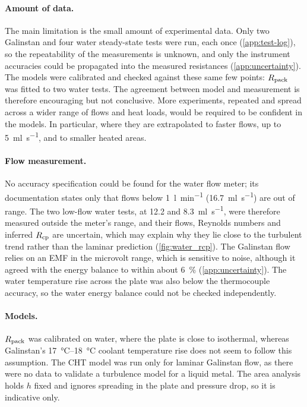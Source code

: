 \paragraph{Amount of data.} The main limitation is the small amount of
experimental data. Only two Galinstan and four water steady-state tests were
run, each once (\cref{app:test-log}), so the repeatability of the measurements
is unknown, and only the instrument accuracies could be propagated into the
measured resistances (\cref{app:uncertainty}). The models
were calibrated and checked against these same few points: $R_{\mathrm{pack}}$ was fitted
to two water tests. The agreement between model and measurement is therefore encouraging
but not conclusive. More experiments, repeated and spread across a wider
range of flows and heat loads, would be required to be confident in the models.
In particular, where they are extrapolated to faster flows, up to \SI{5}{\milli\litre\per\second}, and
to smaller heated areas.

\paragraph{Flow measurement.} No accuracy specification could be found for the
water flow meter; its documentation states only that flows below
\SI{1}{\litre\per\minute} (\SI{16.7}{\milli\litre\per\second}) are out of range.
The two low-flow water tests, at 12.2 and \SI{8.3}{\milli\litre\per\second},
were therefore measured outside the meter's range, and their flows, Reynolds
numbers and inferred $R_{\mathrm{cp}}$ are uncertain, which may explain why they lie close
to the turbulent trend rather than the laminar prediction
(\cref{fig:water_rcp}). The Galinstan flow relies on an EMF in the microvolt
range, which is sensitive to noise, although it agreed with the energy balance
to within about \SI{6}{\percent} (\cref{app:uncertainty}). The water temperature rise across the plate was also
below the thermocouple accuracy, so the water energy balance could not be
checked independently.

\paragraph{Models.} $R_{\mathrm{pack}}$ was calibrated on water, where the plate is close
to isothermal, whereas Galinstan's \SIrange{17}{18}{\celsius} coolant
temperature rise does not seem to follow this assumption. The CHT model was run only for
laminar Galinstan flow, as there were no data to validate a turbulence model for
a liquid metal. The area analysis holds $h$ fixed and ignores spreading in the
plate and pressure drop, so it is indicative only.

